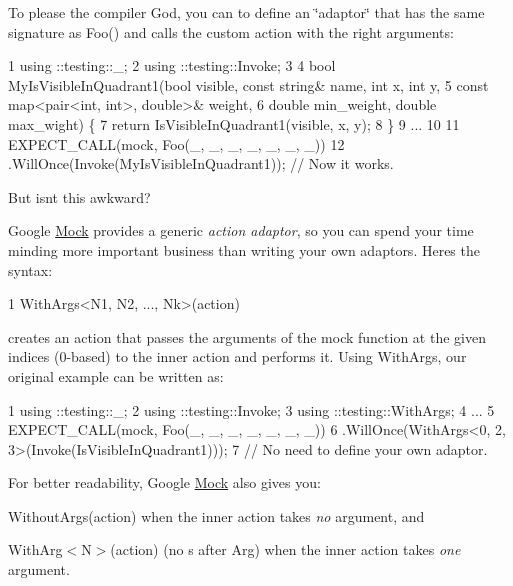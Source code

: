 To please the compiler God, you can to define an \char`\"{}adaptor\char`\"{} that has the same signature as {\ttfamily Foo()} and calls the custom action with the right arguments\+:


\begin{DoxyCode}
1 using ::testing::\_;
2 using ::testing::Invoke;
3 
4 bool MyIsVisibleInQuadrant1(bool visible, const string& name, int x, int y,
5                             const map<pair<int, int>, double>& weight,
6                             double min\_weight, double max\_wight) \{
7   return IsVisibleInQuadrant1(visible, x, y);
8 \}
9 ...
10 
11   EXPECT\_CALL(mock, Foo(\_, \_, \_, \_, \_, \_, \_))
12       .WillOnce(Invoke(MyIsVisibleInQuadrant1));  // Now it works.
\end{DoxyCode}


But isn\textquotesingle{}t this awkward?

Google \hyperlink{classMock}{Mock} provides a generic {\itshape action adaptor}, so you can spend your time minding more important business than writing your own adaptors. Here\textquotesingle{}s the syntax\+:


\begin{DoxyCode}
1 WithArgs<N1, N2, ..., Nk>(action)
\end{DoxyCode}


creates an action that passes the arguments of the mock function at the given indices (0-\/based) to the inner {\ttfamily action} and performs it. Using {\ttfamily With\+Args}, our original example can be written as\+:


\begin{DoxyCode}
1 using ::testing::\_;
2 using ::testing::Invoke;
3 using ::testing::WithArgs;
4 ...
5   EXPECT\_CALL(mock, Foo(\_, \_, \_, \_, \_, \_, \_))
6       .WillOnce(WithArgs<0, 2, 3>(Invoke(IsVisibleInQuadrant1)));
7       // No need to define your own adaptor.
\end{DoxyCode}


For better readability, Google \hyperlink{classMock}{Mock} also gives you\+:


\begin{DoxyItemize}
\item {\ttfamily Without\+Args(action)} when the inner {\ttfamily action} takes {\itshape no} argument, and
\item {\ttfamily With\+Arg$<$N$>$(action)} (no {\ttfamily s} after {\ttfamily Arg}) when the inner {\ttfamily action} takes {\itshape one} argument.
\end{DoxyItemize}

